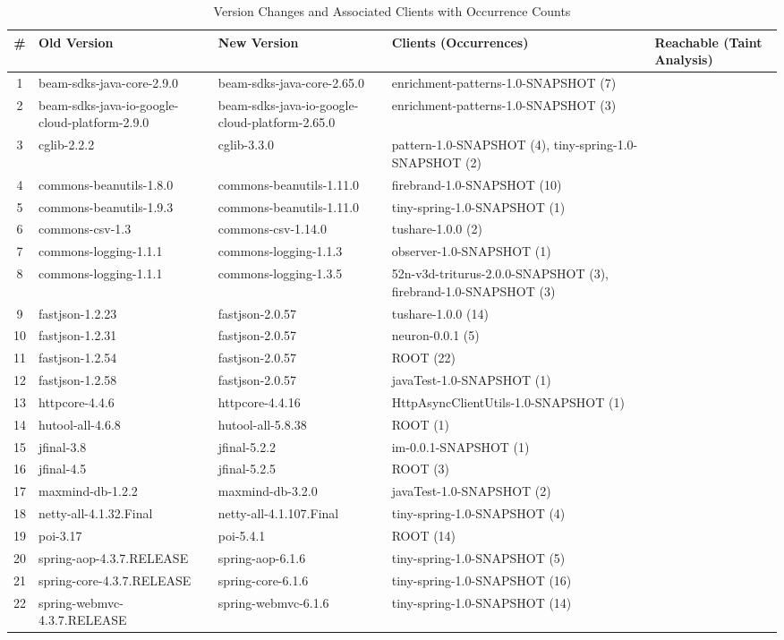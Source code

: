 \begin{table*}[hbt!]
\centering
\caption{Version Changes and Associated Clients with Occurrence Counts}
\label{tab:version-changes}
\begin{tabular}{c >{\raggedright\arraybackslash}p{3.5cm} >{\raggedright\arraybackslash}p{3.5cm} >{\raggedright\arraybackslash}p{6cm} >{\centering\arraybackslash}p{2cm}}
\toprule
\# & \textbf{Old Version} & \textbf{New Version} & \textbf{Clients (Occurrences)} & \textbf{Reachable (Taint Analysis)} \\
\midrule
1 & beam-sdks-java-core-2.9.0 & beam-sdks-java-core-2.65.0 & enrichment-patterns-1.0-SNAPSHOT (7) & \\
2 & beam-sdks-java-io-google-cloud-platform-2.9.0 & beam-sdks-java-io-google-cloud-platform-2.65.0 & enrichment-patterns-1.0-SNAPSHOT (3) & \\
3 & cglib-2.2.2 & cglib-3.3.0 & pattern-1.0-SNAPSHOT (4), tiny-spring-1.0-SNAPSHOT (2) & \\
4 & commons-beanutils-1.8.0 & commons-beanutils-1.11.0 & firebrand-1.0-SNAPSHOT (10) & \\
5 & commons-beanutils-1.9.3 & commons-beanutils-1.11.0 & tiny-spring-1.0-SNAPSHOT (1) & \\
6 & commons-csv-1.3 & commons-csv-1.14.0 & tushare-1.0.0 (2) & \\
7 & commons-logging-1.1.1 & commons-logging-1.1.3 & observer-1.0-SNAPSHOT (1) & \\
8 & commons-logging-1.1.1 & commons-logging-1.3.5 & 52n-v3d-triturus-2.0.0-SNAPSHOT (3), firebrand-1.0-SNAPSHOT (3) & \\
9 & fastjson-1.2.23 & fastjson-2.0.57 & tushare-1.0.0 (14) & \\
10 & fastjson-1.2.31 & fastjson-2.0.57 & neuron-0.0.1 (5) & \\
11 & fastjson-1.2.54 & fastjson-2.0.57 & ROOT (22) & \\
12 & fastjson-1.2.58 & fastjson-2.0.57 & javaTest-1.0-SNAPSHOT (1) & \\
13 & httpcore-4.4.6 & httpcore-4.4.16 & HttpAsyncClientUtils-1.0-SNAPSHOT (1) & \\
14 & hutool-all-4.6.8 & hutool-all-5.8.38 & ROOT (1) & \\
15 & jfinal-3.8 & jfinal-5.2.2 & im-0.0.1-SNAPSHOT (1) & \\
16 & jfinal-4.5 & jfinal-5.2.5 & ROOT (3) & \\
17 & maxmind-db-1.2.2 & maxmind-db-3.2.0 & javaTest-1.0-SNAPSHOT (2) & \\
18 & netty-all-4.1.32.Final & netty-all-4.1.107.Final & tiny-spring-1.0-SNAPSHOT (4) & \\
19 & poi-3.17 & poi-5.4.1 & ROOT (14) & \\
20 & spring-aop-4.3.7.RELEASE & spring-aop-6.1.6 & tiny-spring-1.0-SNAPSHOT (5) & \\
21 & spring-core-4.3.7.RELEASE & spring-core-6.1.6 & tiny-spring-1.0-SNAPSHOT (16) & \\
22 & spring-webmvc-4.3.7.RELEASE & spring-webmvc-6.1.6 & tiny-spring-1.0-SNAPSHOT (14) & \\
\bottomrule
\end{tabular}
\end{table*}


